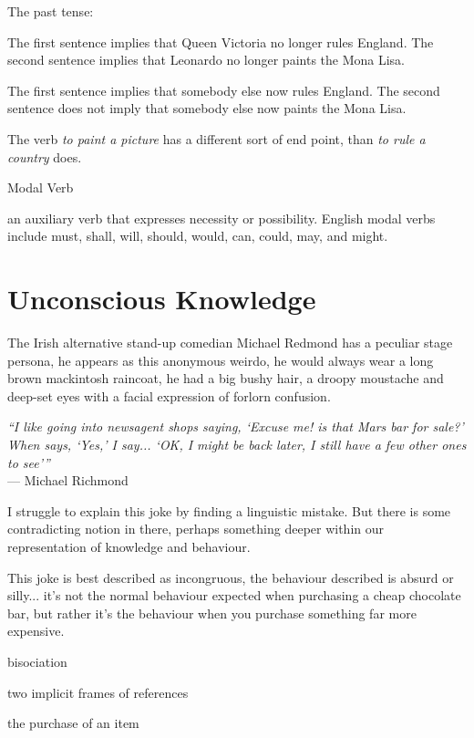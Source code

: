 The past tense:

The first sentence implies that Queen Victoria no longer rules England.
The second sentence implies that Leonardo no longer paints the Mona Lisa.

The first sentence implies that somebody else now rules England.
The second sentence does not imply that somebody else now paints the Mona Lisa.

The verb \textit{to paint a picture} has a different sort of end point, than \textit{to rule a country} does.


Modal Verb

an auxiliary verb that expresses necessity or possibility. English modal verbs include must, shall, will, should, would, can, could, may, and might.







\section{Unconscious Knowledge}

The Irish alternative stand-up comedian Michael Redmond has a peculiar stage persona, he appears as this anonymous weirdo, he would always wear a long brown mackintosh raincoat, he had a big bushy hair, a droopy moustache and deep-set eyes with a facial expression of forlorn confusion.

\begin{center}
\textit{``I like going into newsagent shops saying, `Excuse me! is that Mars bar for sale?' When says, `Yes,' I say... `OK, I might be back later, I still have a few other ones to see'''}\\ --- Michael Richmond
\end{center}

I struggle to explain this joke by finding a linguistic mistake. But there is some contradicting notion in there, perhaps something deeper within our representation of knowledge and behaviour.

This joke is best described as incongruous, the behaviour described is absurd or silly... it's not the normal behaviour expected when purchasing a cheap chocolate bar, but rather it's the behaviour when you purchase something far more expensive.

bisociation

two implicit frames of references

the purchase of an item


